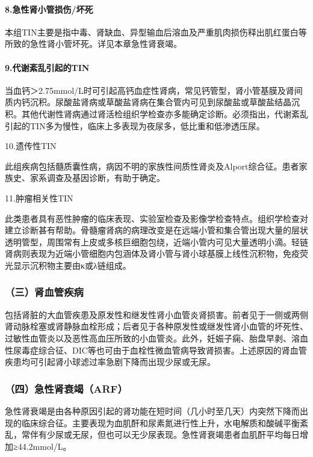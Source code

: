 \paragraph{8.急性肾小管损伤/坏死}

本组TIN主要是指中毒、肾缺血、异型输血后溶血及严重肌肉损伤释出肌红蛋白等所致的急性肾小管坏死。详见本章急性肾衰竭。

\paragraph{9.代谢紊乱引起的TIN}

当血钙＞2.75mmol/L时可引起高钙血症性肾病，常见钙管型，肾小管基膜及肾间质内钙沉积。尿酸盐肾病或草酸盐肾病在集合管内可见到尿酸盐或草酸盐结晶沉积。其他代谢性肾病通过肾活检组织学检查亦多能确定诊断。必须指出，代谢紊乱引起的TIN多为慢性，临床上多表现为夜尿多，低比重和低渗透压尿。

\hypertarget{text00271.htmlux5cux23CHP35-1-4-2-10}{}
10.遗传性TIN

此组疾病包括髓质囊性病，病因不明的家族性间质性肾炎及Alport综合征。患者家族史、家系调查及基因诊断，有助于确定。

\hypertarget{text00271.htmlux5cux23CHP35-1-4-2-11}{}
11.肿瘤相关性TIN

此类患者具有恶性肿瘤的临床表现、实验室检查及影像学检查特点。组织学检查对建立诊断甚有帮助。骨髓瘤肾病的病理改变是在远端小管和集合管出现大量的层状透明管型，周围常有上皮或多核巨细胞包绕，近端小管内可见大量透明小滴。轻链肾病则表现为近端小管细胞内包涵体及肾小管与肾小球基膜上线性沉积物，免疫荧光显示沉积物主要由κ或λ链组成。

\subsubsection{（三）肾血管疾病}

包括肾脏的大血管疾患及原发性和继发性肾小血管炎肾损害。前者见于一侧或两侧肾动脉栓塞或肾静脉血栓形成；后者见于各种原发性或继发性肾小血管的坏死性、过敏性血管炎以及恶性高血压所致的小血管炎。此外，妊娠子痫、胎盘早剥、溶血性尿毒症综合征、DIC等也可由于血栓性微血管病导致肾损害。上述原因的肾血管疾患均可引起肾小球滤过率急剧下降而出现少尿或无尿。

\subsubsection{（四）急性肾衰竭（ARF）}

急性肾衰竭是由各种原因引起的肾功能在短时间（几小时至几天）内突然下降而出现的临床综合征。主要表现为血肌酐和尿素氮进行性上升，水电解质和酸碱平衡紊乱，常伴有少尿或无尿，但也可以无少尿表现。急性肾衰竭患者血肌酐平均每日增加≥44.2mmol/L。

